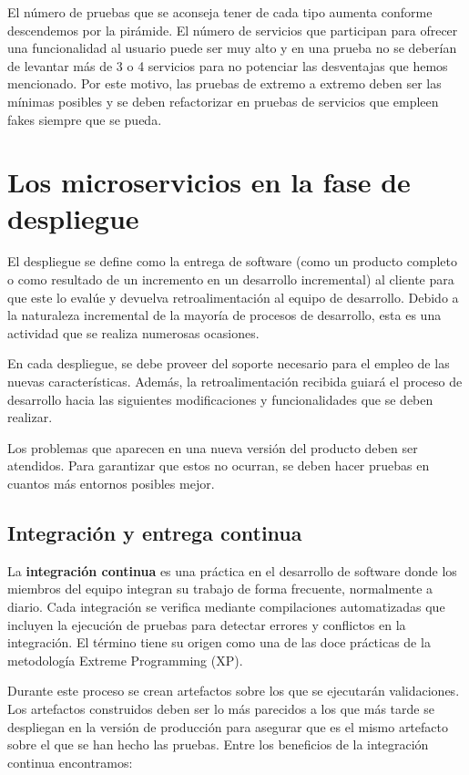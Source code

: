\documentclass[11pt,spanish,listoffigures,listoftables]{tfgetsinf}
\begin{document}
El número de pruebas que se aconseja tener de cada tipo aumenta conforme descendemos por la pirámide. El número de servicios que participan para ofrecer una funcionalidad al usuario puede ser muy alto y en una prueba no se deberían de levantar más de 3 o 4 servicios para no potenciar las desventajas que hemos mencionado. Por este motivo, las pruebas de extremo a extremo deben ser las mínimas posibles y se deben refactorizar en pruebas de servicios que empleen fakes siempre que se pueda.

\section{Los microservicios en la fase de despliegue}

El despliegue se define como la entrega de software (como un producto completo o como resultado de un incremento en un desarrollo incremental) al cliente para que este lo evalúe y devuelva retroalimentación al equipo de desarrollo. \cite{Pressman} Debido a la naturaleza incremental de la mayoría de procesos de desarrollo, esta es una actividad que se realiza numerosas ocasiones. 

En cada despliegue, se debe proveer del soporte necesario para el empleo de las nuevas características. Además, la retroalimentación recibida guiará el proceso de desarrollo hacia las siguientes modificaciones y funcionalidades que se deben realizar.

Los problemas que aparecen en una nueva versión del producto deben ser atendidos. Para garantizar que estos no ocurran, se deben hacer pruebas en cuantos más entornos posibles mejor.

\subsection{Integración y entrega continua}

La \textbf{integración continua} es una práctica en el desarrollo de software donde los miembros del equipo integran su trabajo de forma frecuente, normalmente a diario. Cada integración se verifica mediante compilaciones automatizadas que incluyen la ejecución de pruebas para detectar errores y conflictos en la integración. \cite{Fowler2006} El término tiene su origen como una de las doce prácticas de la metodología Extreme Programming (XP).

Durante este proceso se crean artefactos sobre los que se ejecutarán validaciones. Los artefactos construidos deben ser lo más parecidos a los que más tarde se despliegan en la versión de producción para asegurar que es el mismo artefacto sobre el que se han hecho las pruebas. Entre los beneficios de la integración continua encontramos:
 
\end{document}
